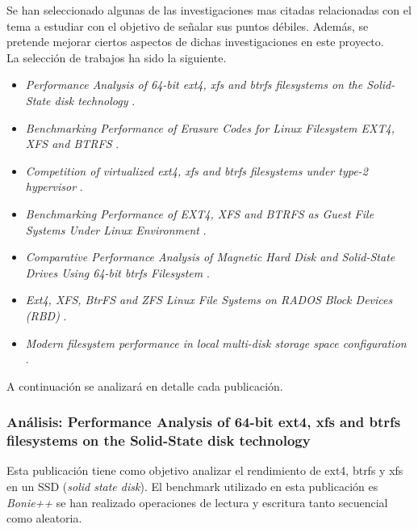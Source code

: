 Se han seleccionado algunas de las investigaciones mas citadas relacionadas con el tema a estudiar con el objetivo de señalar sus puntos débiles.  Además, se pretende mejorar ciertos aspectos de dichas investigaciones en este proyecto.\\

La selección de trabajos ha sido la siguiente.
\begin{itemize}
    \item \textit{Performance Analysis of 64-bit ext4, xfs and btrfs filesystems on the Solid-State disk technology} \cite{Kljaji2016PerformanceAO}.
    
    \item \textit{Benchmarking Performance of Erasure Codes for Linux Filesystem EXT4, XFS and BTRFS} \cite{10.1007/978-981-15-6584-7_32}.
    
    \item \textit{Competition of virtualized ext4, xfs and btrfs filesystems under type-2 hypervisor} \cite{competitionvirtualized}.
    
    \item \textit{Benchmarking Performance of EXT4, XFS and BTRFS as Guest File Systems Under Linux Environment} \cite{serbios}.
    
    \item \textit{Comparative Performance Analysis of Magnetic Hard Disk and Solid-State Drives Using 64-bit btrfs Filesystem} \cite{Stojkov2016ComparativePA}.
    
    \item \textit{Ext4, XFS, BtrFS and ZFS Linux File Systems on RADOS Block Devices (RBD)} \cite{7881982}.
    
    \item \textit{Modern filesystem performance in local multi-disk storage space configuration} \cite{Smolinski2014ModernFP}.
    
\end{itemize}

A continuación se analizará en detalle cada publicación.

\subsubsection{Análisis: Performance Analysis of 64-bit ext4, xfs and btrfs filesystems on the Solid-State disk technology}

Esta publicación tiene como objetivo analizar el rendimiento de ext4, btrfs y xfs en un SSD (\textit{solid state disk}). El benchmark utilizado en esta publicación es \textit{Bonie++} se han realizado operaciones de lectura y escritura tanto secuencial como aleatoria.\\

